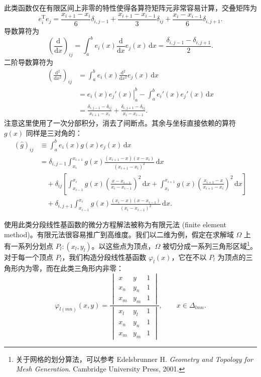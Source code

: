 此类函数仅在有限区间上非零的特性使得各算符矩阵元非常容易计算，交叠矩阵为
\begin{equation}
e_i^{\mathrm T}e_j=
\frac{x_{i+1}-x_i}{6}\delta_{i,j-1}
+\frac{x_{i+1}-x_{i-1}}{3}\delta_{ij}
+\frac{x_i-x_{i-1}}{6}\delta_{i,j+1}.
\tag{5.4.21}
\end{equation}
导数算符为
\begin{equation}
\left(\frac{\mathrm d}{\mathrm dx}\right)_{ij}
=\int_a^b e_i(x)\frac{\mathrm d}{\mathrm dx}e_j(x)\,\mathrm dx
=\frac{\delta_{i,j-1}-\delta_{i,j+1}}{2}.
\tag{5.4.22}
\end{equation}
二阶导数算符为
\begin{equation}
\begin{aligned}
\left(\frac{\mathrm d^2}{\mathrm dx^2}\right)_{ij}
&=\int_a^b e_i(x)\frac{\mathrm d^2}{\mathrm dx^2}e_j(x)\,\mathrm dx\\
&=\left.e_i(x)e_j'(x)\right|_a^b-\int_a^b e_i'(x)e_j'(x)\,\mathrm dx\\
&=\frac{\delta_{i,j-1}-\delta_{ij}}{x_{i+1}-x_i}
+\frac{\delta_{i,j+1}-\delta_{ij}}{x_i-x_{i-1}}.
\end{aligned}
\tag{5.4.23}
\end{equation}
注意这里使用了一次分部积分，消去了间断点。其余与坐标直接依赖的算符 $g(x)$ 同样是三对角的：
\begin{equation}
\begin{aligned}
(\hat g)_{ij}&\equiv\int_a^b e_i(x)g(x)e_j(x)\,\mathrm dx\\
&=\delta_{i,j-1}\int_{x_i}^{x_{i+1}}g(x)\frac{(x_{i+1}-x)(x-x_i)}{(x_{i+1}-x_i)^2}\,\mathrm dx\\
&\quad+\delta_{ij}\left[\int_{x_{i-1}}^{x_i}g(x)\left(\frac{x-x_{i-1}}{x_i-x_{i-1}}\right)^2\,\mathrm dx
+\int_{x_i}^{x_{i+1}}g(x)\left(\frac{x_{i+1}-x}{x_{i+1}-x_i}\right)^2\,\mathrm dx\right]\\
&\quad+\delta_{i,j+1}\int_{x_{i-1}}^{x_i}g(x)\frac{(x_i-x)(x-x_{i-1})}{(x_i-x_{i-1})^2}\,\mathrm dx.
\end{aligned}
\tag{5.4.24}
\end{equation}

使用此类分段线性基函数的微分方程解法被称为有限元法 (finite element method)。有限元法很容易推广到高维度。我们以二维为例，假定在求解域 $\Omega$ 上有一系列分划点 $P_l:(x_l,y_l)$。以这些点为顶点，$\Omega$ 被切分成一系列三角形区域\footnote{关于网格的划分算法，可以参考 Edelsbrunner H. \textit{Geometry and Topology for Mesh Generation}. Cambridge University Press, 2001.}。对于每一个顶点 $P_l$，我们构造分段线性基函数 $\varphi_l(x)$，它在不以 $P_l$ 为顶点的三角形内为零，而在此类三角形内非零：
\begin{equation}
\varphi_{l(mn)}(x,y)=
\frac{\begin{vmatrix}x&y&1\\x_n&y_n&1\\x_m&y_m&1\end{vmatrix}}
{\begin{vmatrix}x_l&y_l&1\\x_n&y_n&1\\x_m&y_m&1\end{vmatrix}},
\qquad x\in\Delta_{lmn}.
\tag{5.4.25}
\end{equation}


